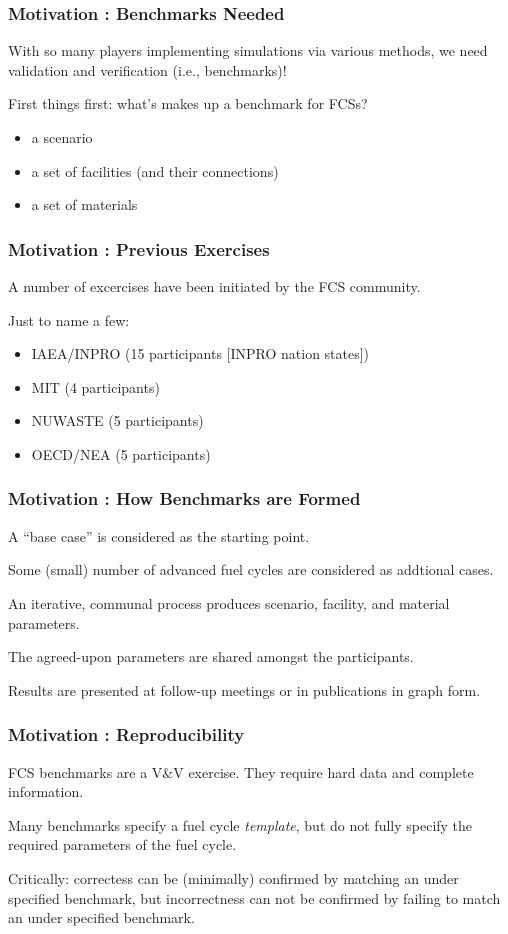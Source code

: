 
\begin{frame}[ctb!]
  \frametitle{Motivation : Benchmarks Needed} 
  With so many players implementing simulations via various methods, we need 
  validation and verification (i.e., benchmarks)!

  First things first: what's makes up a benchmark for FCSs?

  \begin{itemize}
    \item a scenario
    \item a set of facilities (and their connections)
    \item a set of materials
  \end{itemize}
\end{frame}

\begin{frame}[ctb!]
  \frametitle{Motivation : Previous Exercises}
  A number of excercises have been initiated by the FCS community.

  Just to name a few:
  \begin{itemize}
    \item IAEA/INPRO (15 participants [INPRO nation states])\cite{_international_2011}
    \item MIT (4 participants) \cite{guerin_benchmark_2009}
    \item NUWASTE (5 participants) \cite{abkowitz_workshop_2011}
    \item OECD/NEA (5 participants) \cite{boucher_benchmark_2012}
  \end{itemize}
\end{frame}

\begin{frame}[ctb!]
  \frametitle{Motivation : How Benchmarks are Formed}
  A ``base case'' is considered as the starting point.

  Some (small) number of advanced fuel cycles are considered as addtional cases.

  An iterative, communal process produces scenario, facility, and material
  parameters.

  The agreed-upon parameters are shared amongst the participants.

  Results are presented at follow-up meetings or in publications in graph form.
\end{frame}

\begin{frame}[ctb!]
  \frametitle{Motivation : Reproducibility}
  FCS benchmarks are a V\&V exercise. They require hard data and complete 
  information.

  Many benchmarks specify a fuel cycle \textit{template}, but do not fully 
  specify the required parameters of the fuel cycle.

  Critically: correctess can be (minimally) confirmed by matching an under
  specified benchmark, but incorrectness can not be confirmed by failing to
  match an under specified benchmark.
\end{frame}
